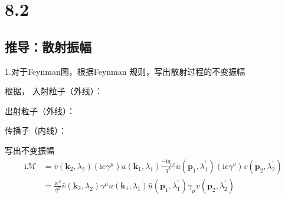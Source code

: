 \section{8.2}








\subsection{推导：散射振幅}


1.对于Feynman图，根据Feynman 规则，写出散射过程的不变振幅

根据，
入射粒子（外线）：

出射粒子（外线）：

传播子（内线）：

写出不变振幅
\begin{equation}
    \begin{aligned}
        \mathrm{i}\mathcal{M} &=\bar{v}(\mathbf{k}_2,\lambda _2)\left( \mathrm{i}e\gamma ^{\mu} \right) u(\mathbf{k}_1,\lambda _1)\frac{-\mathrm{i}g_{\mu \nu}}{q^2}\bar{u}(\mathbf{p}_1,\lambda _{1}^{\prime})\left( \mathrm{i}e\gamma ^{\nu} \right) v(\mathbf{p}_2,\lambda _{2}^{\prime})
\\
&=\frac{\mathrm{i}e^2}{q^2}\bar{v}(\mathbf{k}_2,\lambda _2)\gamma ^{\mu}u(\mathbf{k}_1,\lambda _1)\bar{u}(\mathbf{p}_1,\lambda _{1}^{\prime})\gamma _{\mu}v(\mathbf{p}_2,\lambda _{2}^{\prime})
    \end{aligned}
\end{equation}


